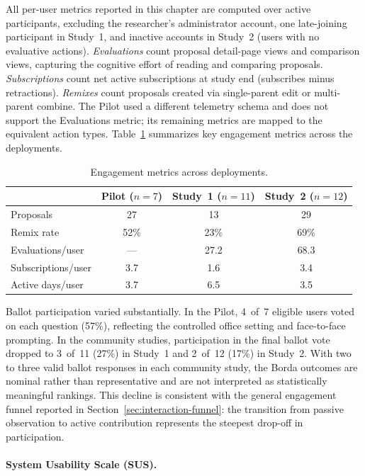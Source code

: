 \documentclass[a4paper, 12pt, twoside]{iviathesis}
\begin{document}
All per-user metrics reported in this chapter are computed over active participants, excluding the researcher's administrator account, one late-joining participant in Study~1, and inactive accounts in Study~2 (users with no evaluative actions). \textit{Evaluations} count proposal detail-page views and comparison views, capturing the cognitive effort of reading and comparing proposals. \textit{Subscriptions} count net active subscriptions at study end (subscribes minus retractions). \textit{Remixes} count proposals created via single-parent edit or multi-parent combine. The Pilot used a different telemetry schema and does not support the Evaluations metric; its remaining metrics are mapped to the equivalent action types. Table~\ref{tab:engagement} summarizes key engagement metrics across the deployments.

\begin{table}[htbp]
\centering
\caption{Engagement metrics across deployments.}
\label{tab:engagement}
\begin{tabular}{lccc}
\toprule
 & Pilot ($n{=}7$) & Study~1 ($n{=}11$) & Study~2 ($n{=}12$) \\
\midrule
Proposals & 27 & 13 & 29 \\
Remix rate & 52\% & 23\% & 69\% \\
Evaluations/user & --- & 27.2 & 68.3 \\
Subscriptions/user & 3.7 & 1.6 & 3.4 \\
Active days/user & 3.7 & 6.5 & 3.5 \\
\bottomrule
\end{tabular}
\end{table}

Ballot participation varied substantially. In the Pilot, 4~of~7 eligible users voted on each question (57\%), reflecting the controlled office setting and face-to-face prompting. In the community studies, participation in the final ballot vote dropped to 3~of~11 (27\%) in Study~1 and 2~of~12 (17\%) in Study~2. With two to three valid ballot responses in each community study, the Borda outcomes are nominal rather than representative and are not interpreted as statistically meaningful rankings. This decline is consistent with the general engagement funnel reported in Section~\ref{sec:interaction-funnel}: the transition from passive observation to active contribution represents the steepest drop-off in participation.

\paragraph{System Usability Scale (SUS).}
\end{document}
